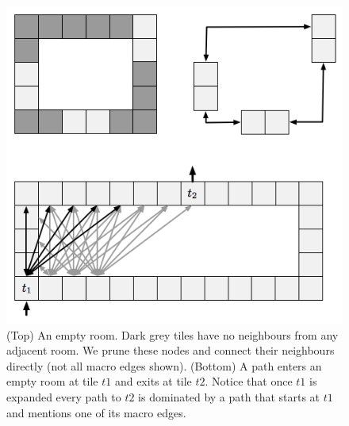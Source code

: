 \begin{figure}[tb]
       \begin{center}
                       \includegraphics[scale=0.5, trim = 10mm 10mm 10mm 0mm]{diagrams/branching.png}
       \end{center}
	\vspace{-3pt}
       \caption{(Top) An empty room. Dark grey tiles have no neighbours from any adjacent room. 
We prune these nodes and connect their neighbours directly (not all macro edges shown).
		(Bottom) A path enters an empty room at tile $t1$ and exits at tile $t2$. Notice that once
$t1$ is expanded every path to $t2$ is dominated by a path that starts at $t1$ and mentions one of its macro edges.
}
       \label{fig-macroedges}
\end{figure}
